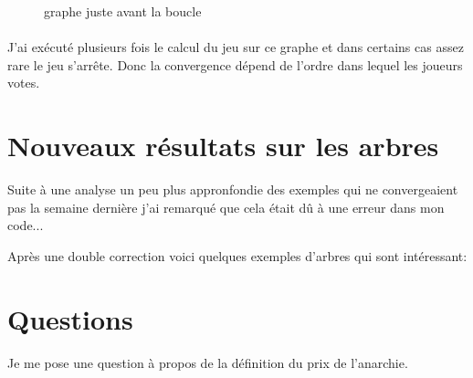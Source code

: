 \documentclass[12pt]{article}
\theoremstyle{defi}
\theoremstyle{not}
\theoremstyle{prob}
\begin{document}
      \begin{figure}
      \centering
      \caption{graphe juste avant la boucle}
      \label{fig:avant_boucle}
      \end{figure}

      \paragraph{}J'ai exécuté plusieurs fois le calcul du jeu sur ce graphe et dans certains cas assez rare le jeu s'arrête. Donc la convergence dépend de l'ordre dans lequel les joueurs votes.
\color{blue}
  \section{Nouveaux résultats sur les arbres}
    Suite à une analyse un peu plus appronfondie des exemples qui ne convergeaient pas la semaine dernière j'ai remarqué que cela était dû à une erreur dans mon code...

    Après une double correction voici quelques exemples d'arbres qui sont intéressant:
     


\color{black}
  \section{Questions}
    Je me pose une question à propos de la définition du prix de l'anarchie.
\end{document}
